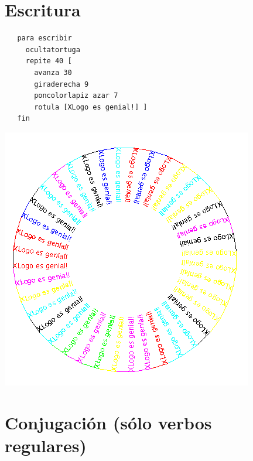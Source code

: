 \section{Escritura}
   \label{Escritura}

\begin{verbatim}
   para escribir 
     ocultatortuga
     repite 40 [
       avanza 30
       giraderecha 9
       poncolorlapiz azar 7
       rotula [XLogo es genial!] ] 
   fin \end{verbatim}
\begin{center}
   \includegraphics[scale=0.6]{Imagenes/13_Ejemplos/Escritura.png}
\end{center}

\section{Conjugaci\'on (s\'olo verbos regulares)}
   \label{Conjugacion}


